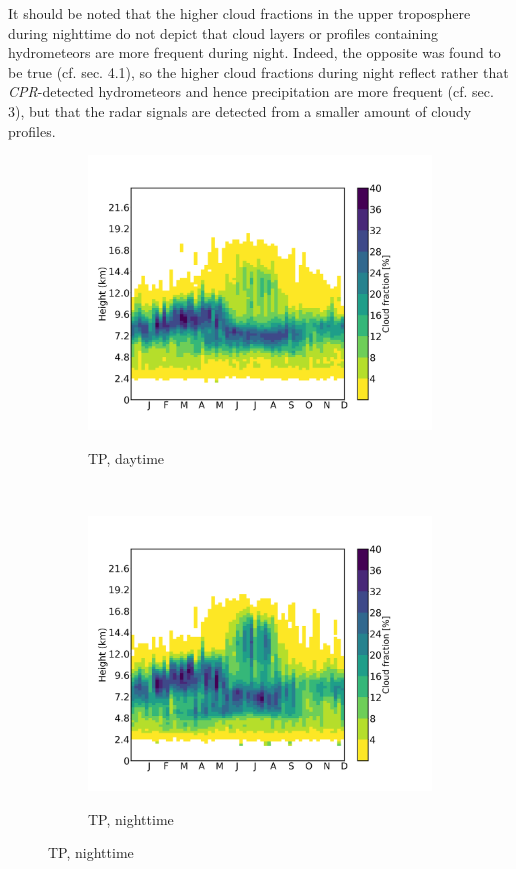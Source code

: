 \documentclass[alpha-refs]{wiley-article}
\begin{document}
It should be noted that the higher cloud fractions in the upper troposphere during nighttime do not depict that cloud layers or profiles containing hydrometeors are more frequent during night. Indeed, the opposite was found to be true (cf. sec. 4.1), so the higher cloud fractions during night reflect rather that \textit{CPR}-detected hydrometeors and hence precipitation are more frequent (cf. sec. 3), but that the radar signals are detected from a smaller amount of cloudy profiles. 


\begin{figure}[!htbp]
\centering
    \begin{subfigure}[b]{0.5\textwidth}
       \centering
        \caption{TP, daytime}
        \includegraphics[width=\textwidth]{cloudsat_cloudfract_seasonal_pentadavg_day.png}
        \label{fig:vertical_cloudfract1}
    \end{subfigure}%
    ~ 
    \begin{subfigure}[b]{0.5\textwidth}
        \centering
        \caption{TP, nighttime}        
        \includegraphics[width=\textwidth]{cloudsat_cloudfract_seasonal_pentadavg_night.png}
        \label{fig:vertical_cloudfract2}


\end{subfigure}
\end{figure}
\end{document}

